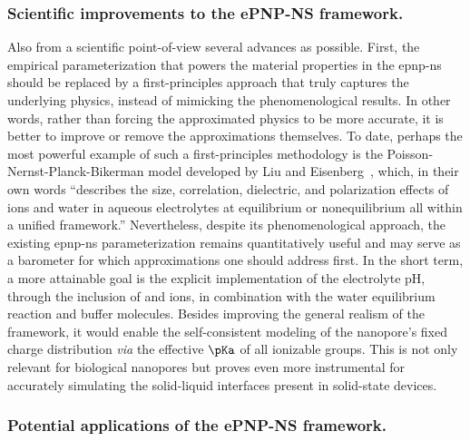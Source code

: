 \subsubsection{Scientific improvements to the {ePNP-NS} framework.}
%

Also from a scientific point-of-view several advances as possible. First, the empirical parameterization that
powers the material properties in the \gls{epnp-ns} should be replaced by a first-principles approach that
truly captures the underlying physics, instead of mimicking the phenomenological results. In other words,
rather than forcing the approximated physics to be more accurate, it is better to improve or remove the
approximations themselves. To date, perhaps the most powerful example of such a first-principles methodology
is the Poisson-Nernst-Planck-Bikerman model developed by Liu and Eisenberg~\cite{Liu-2020}, which, in their
own words ``describes the size, correlation, dielectric, and polarization effects of ions and water in aqueous
electrolytes at equilibrium or nonequilibrium all within a unified framework.'' Nevertheless, despite its
phenomenological approach, the existing \gls{epnp-ns} parameterization remains quantitatively useful and may
serve as a barometer for which approximations one should address first. In the short term, a more attainable
goal is the explicit implementation of the electrolyte pH, through the inclusion of  and  ions,
in combination with the water equilibrium reaction and buffer molecules. Besides improving the general realism
of the framework, it would enable the self-consistent modeling of the nanopore's fixed charge distribution
\textit{via} the effective $\pKa$ of all ionizable groups. This is not only relevant for biological nanopores
but proves even more instrumental for accurately simulating the solid-liquid interfaces present in solid-state
devices.


\subsubsection{Potential applications of the {ePNP-NS} framework.}
%

